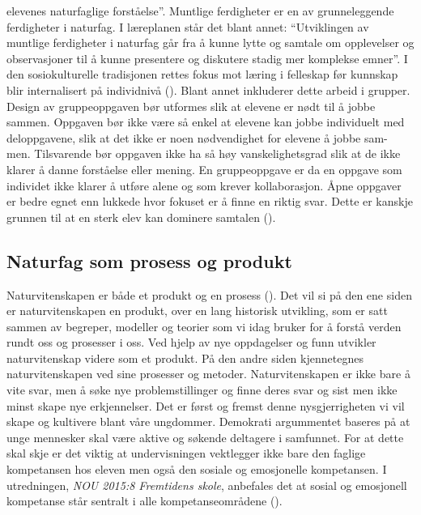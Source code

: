 \documentclass[main.tex]{subfiles}
\begin{document}
elevenes naturfaglige forståelse''. Muntlige ferdigheter er en av grunneleggende ferdigheter i naturfag. 
I læreplanen står det blant annet: ``Utviklingen av muntlige ferdigheter i naturfag går
fra å kunne lytte og samtale om opplevelser og observasjoner til å kunne presentere og diskutere 
stadig mer komplekse emner''. I den sosiokulturelle tradisjonen rettes fokus mot læring i
felleskap før kunnskap blir internalisert på individnivå (). Blant annet inkluderer 
dette arbeid i grupper.
\newline\newline
Design av gruppeoppgaven bør utformes slik at
elevene er nødt til å jobbe sammen. Oppgaven bør ikke være så enkel at elevene kan jobbe
individuelt med deloppgavene, slik at det ikke er noen nødvendighet for elevene å jobbe sam-
men. Tilsvarende bør oppgaven ikke ha så høy vanskelighetsgrad slik at de ikke klarer å danne
forståelse eller mening. En gruppeoppgave er da en oppgave som individet ikke klarer å utføre
alene og som krever kollaborasjon. Åpne oppgaver er bedre egnet enn lukkede hvor fokuset er
å finne en riktig svar. Dette er kanskje grunnen til at en sterk elev kan dominere samtalen 
().

\subsection*{Naturfag som prosess og produkt}
Naturvitenskapen er både et produkt og en prosess (). Det vil si på den ene siden er 
naturvitenskapen en produkt, over en lang historisk utvikling, som er satt sammen av begreper, modeller og
teorier som vi idag bruker for å forstå verden rundt oss og prosesser i oss. Ved hjelp av nye oppdagelser og funn utvikler
naturvitenskap videre som et produkt. På den andre siden kjennetegnes naturvitenskapen ved sine prosesser
og metoder. Naturvitenskapen er ikke bare å vite svar, men å søke nye problemstillinger og finne deres svar og
sist men ikke minst skape nye erkjennelser. Det er først og fremst denne nysgjerrigheten vi vil skape og kultivere
blant våre ungdommer. Demokrati argummentet baseres på at unge mennesker skal være aktive og søkende deltagere
i samfunnet. For at dette skal skje er det viktig at undervisningen vektlegger ikke bare den faglige kompetansen
hos eleven men også den sosiale og emosjonelle kompetansen. I utredningen, \emph{NOU 2015:8 Fremtidens skole}, 
anbefales det at sosial og emosjonell kompetanse står sentralt i alle kompetanseområdene ().  
\end{document}
